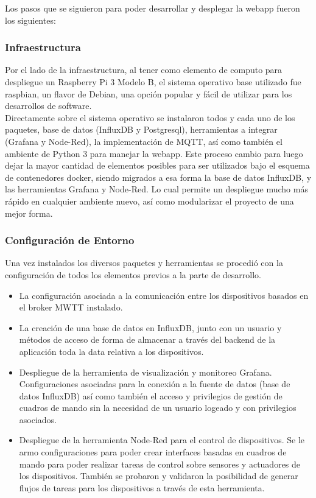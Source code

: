 Los pasos que se siguieron para poder desarrollar y desplegar la webapp fueron los siguientes:

\subsubsection{Infraestructura}
Por el lado de la infraestructura, al tener como elemento de computo para despliegue un Raspberry Pi 3 Modelo B, el sistema operativo base utilizado fue raspbian, un flavor de Debian, una opción popular y fácil de utilizar para los desarrollos de software.\\

Directamente sobre el sistema operativo se instalaron todos y cada uno de los paquetes, base de datos (InfluxDB y Postgresql), herramientas a integrar (Grafana y Node-Red), la implementación de MQTT, así como también el ambiente de Python 3 para manejar la webapp.  Este proceso cambio para luego dejar la mayor cantidad de elementos posibles para ser utilizados bajo el esquema de contenedores docker, siendo migrados a esa forma la base de datos InfluxDB, y las herramientas Grafana y Node-Red. Lo cual permite un despliegue mucho más rápido en cualquier ambiente nuevo, así como modularizar el proyecto de una mejor forma.

\subsubsection{Configuración de Entorno}
Una vez instalados los diversos paquetes y herramientas se procedió con la configuración de todos los elementos previos a la parte de desarrollo.
\begin{itemize}
\item La configuración asociada a la comunicación entre los dispositivos basados en el broker MWTT instalado. 
\item La creación de una base de datos en InfluxDB, junto con un usuario y métodos de acceso de forma de almacenar a través del backend de la aplicación toda la data relativa a los dispositivos. 
\item Despliegue de la herramienta de visualización y monitoreo Grafana. Configuraciones asociadas para la conexión a la fuente de datos (base de datos InfluxDB) así como también el acceso y privilegios de gestión de cuadros de mando sin la necesidad de un usuario logeado y con privilegios asociados.
\item Despliegue de la herramienta Node-Red para el control de dispositivos. Se le armo configuraciones para poder crear interfaces basadas en cuadros de mando para poder realizar tareas de control sobre sensores y actuadores de los dispositivos. También se probaron y validaron la posibilidad de generar flujos de tareas para los dispositivos a través de esta herramienta.
\end{itemize}

